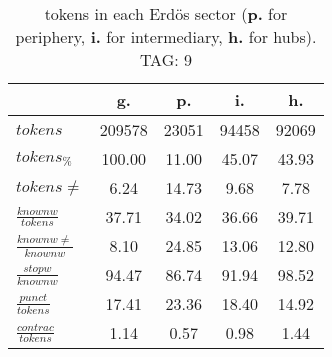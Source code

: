 \begin{table}[h!]
\begin{center}
\begin{tabular}{| l || c | c | c | c |}\hline
 & {\bf g.} & {\bf p.} & {\bf i.} & {\bf h.} \\\hline\hline
$tokens$ & 209578  & 23051  & 94458  & 92069 \\
$tokens_{\%}$ & 100.00  & 11.00  & 45.07  & 43.93 \\
$tokens \neq$ & 6.24  & 14.73  & 9.68  & 7.78 \\\hline
$\frac{knownw}{tokens}$ & 37.71  & 34.02  & 36.66  & 39.71 \\
$\frac{knownw \neq}{knownw}$ & 8.10  & 24.85  & 13.06  & 12.80 \\\hline
$\frac{stopw}{knownw}$ & 94.47  & 86.74  & 91.94  & 98.52 \\
$\frac{punct}{tokens}$ & 17.41  & 23.36  & 18.40  & 14.92 \\
$\frac{contrac}{tokens}$ & 1.14  & 0.57  & 0.98  & 1.44 \\\hline
\end{tabular}
\caption{tokens in each Erd\"os sector ({{\bf p.}} for periphery, {{\bf i.}} for intermediary, 
    {{\bf h.}} for hubs). TAG: 9}
\end{center}
\end{table}